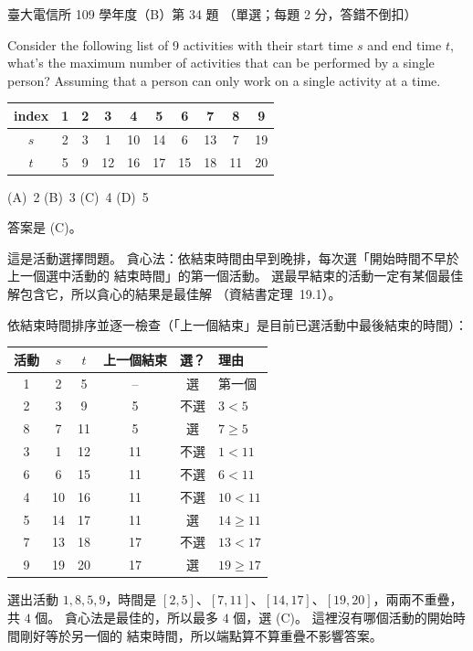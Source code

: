 \begin{pastexam}[label={px:ntu-109-comm-dsa-34}]{臺大電信所 109 學年度（B）第 34 題}
（單選；每題 2 分，答錯不倒扣）

Consider the following list of 9 activities with their start time $s$ and end time $t$, what's the
maximum number of activities that can be performed by a single person? Assuming that a person can
only work on a single activity at a time.

\begin{center}
\begin{tabular}{|c|c|c|c|c|c|c|c|c|c|}\hline
\textbf{index} & 1 & 2 & 3 & 4 & 5 & 6 & 7 & 8 & 9\\\hline
$s$ & 2 & 3 & 1 & 10 & 14 & 6 & 13 & 7 & 19\\\hline
$t$ & 5 & 9 & 12 & 16 & 17 & 15 & 18 & 11 & 20\\\hline
\end{tabular}
\end{center}
(A)~2 \qquad (B)~3 \qquad (C)~4 \qquad (D)~5
\end{pastexam}

\begin{pastsoln}
答案是 (C)。

這是活動選擇問題。 貪心法：依結束時間由早到晚排，每次選「開始時間不早於上一個選中活動的
結束時間」的第一個活動。 選最早結束的活動一定有某個最佳解包含它，所以貪心的結果是最佳解
（資結書定理~19.1）。

依結束時間排序並逐一檢查（「上一個結束」是目前已選活動中最後結束的時間）：
\begin{center}
\begin{tabular}{cccccl}
\toprule
活動 & $s$ & $t$ & 上一個結束 & 選？ & 理由 \\
\midrule
1 & 2 & 5 & -- & 選 & 第一個 \\
2 & 3 & 9 & 5 & 不選 & $3 < 5$ \\
8 & 7 & 11 & 5 & 選 & $7 \ge 5$ \\
3 & 1 & 12 & 11 & 不選 & $1 < 11$ \\
6 & 6 & 15 & 11 & 不選 & $6 < 11$ \\
4 & 10 & 16 & 11 & 不選 & $10 < 11$ \\
5 & 14 & 17 & 11 & 選 & $14 \ge 11$ \\
7 & 13 & 18 & 17 & 不選 & $13 < 17$ \\
9 & 19 & 20 & 17 & 選 & $19 \ge 17$ \\
\bottomrule
\end{tabular}
\end{center}
選出活動 $1, 8, 5, 9$，時間是 $[2, 5]$、$[7, 11]$、$[14, 17]$、$[19, 20]$，兩兩不重疊，共
$4$ 個。 貪心法是最佳的，所以最多 $4$ 個，選 (C)。 這裡沒有哪個活動的開始時間剛好等於另一個的
結束時間，所以端點算不算重疊不影響答案。
\end{pastsoln}
